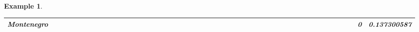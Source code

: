 \documentclass[a4paper,11pt]{report}
\newtheorem{example}[theorem]{Example}
\begin{document}
\begin{example}
\begin{appendices}
\begin{landscape}
\begin{longtable}{r|r|r|r|r|r|r|r|r|r|r|r|r|r|r|r|r|r|r|r|r|r|r|r|r|r|r|r|r|r|r|r|r|r|r|r|r|r|r|r|r|r|r|r|r|r|r|}
\multicolumn{1}{|r|}{\textbf{Montenegro}}            &                                       &                                       &                                          &                                       &                                       &                                                     &                                        &                                       &                                      &                                       &                                       &                                                &                                       &                                      &                                       &                                       &                                      &                                       &                                       &                                       &                                      &                                     &                                      &                                         &                                     &                                       &                                          &                                      &                                        &                                       &                                      &                                          &                                      &                                        &                                        &                                     &                                      &                                           &                                               &                                      &                                       &                                              &                                      &                                     & 0                                             & 0.137300587                             \\ \hline

\end{longtable}
\end{landscape}
\end{appendices}
\end{example}
\end{document}
